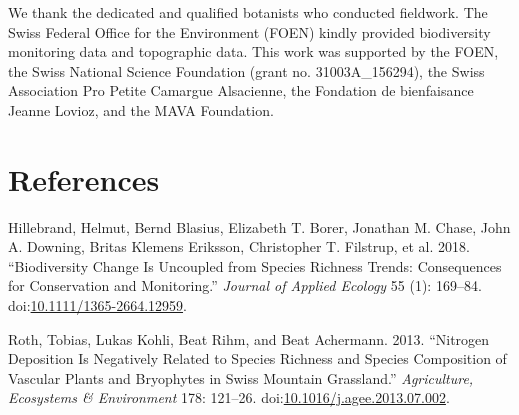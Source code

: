 \documentclass[fleqn,10pt,lineno]{wlpeerj} %
\theoremstyle{definition}
\theoremstyle{definition}
\theoremstyle{definition}
\theoremstyle{remark}
\begin{document}
We thank the dedicated and qualified botanists who conducted fieldwork.
The Swiss Federal Office for the Environment (FOEN) kindly provided
biodiversity monitoring data and topographic data. This work was
supported by the FOEN, the Swiss National Science Foundation (grant no.
31003A\_156294), the Swiss Association Pro Petite Camargue Alsacienne,
the Fondation de bienfaisance Jeanne Lovioz, and the MAVA Foundation.

\section*{References}\label{references}

\hypertarget{refs}{}
\hypertarget{ref-Hillebrand2018}{}
Hillebrand, Helmut, Bernd Blasius, Elizabeth T. Borer, Jonathan M.
Chase, John A. Downing, Britas Klemens Eriksson, Christopher T.
Filstrup, et al. 2018. ``Biodiversity Change Is Uncoupled from Species
Richness Trends: Consequences for Conservation and Monitoring.''
\emph{Journal of Applied Ecology} 55 (1): 169--84.
doi:\href{https://doi.org/10.1111/1365-2664.12959}{10.1111/1365-2664.12959}.

\hypertarget{ref-Roth2013}{}
Roth, Tobias, Lukas Kohli, Beat Rihm, and Beat Achermann. 2013.
``Nitrogen Deposition Is Negatively Related to Species Richness and
Species Composition of Vascular Plants and Bryophytes in Swiss Mountain
Grassland.'' \emph{Agriculture, Ecosystems \& Environment} 178: 121--26.
doi:\href{https://doi.org/10.1016/j.agee.2013.07.002}{10.1016/j.agee.2013.07.002}.
\end{document}
